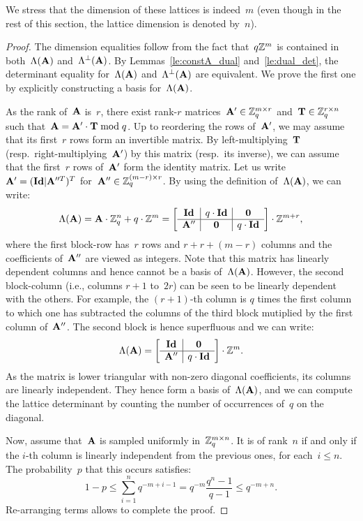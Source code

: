 We stress that the dimension of these lattices is indeed~$m$ (even though in the rest of this section, the lattice dimension is denoted
by~$n$).%


\begin{proof}
The dimension equalities follow from the fact that~$q \mathbb{Z}^m$ is contained in 
both~$\Lambda({\bf A})$ and~$\Lambda^{\perp}({\bf A})$. By Lemmas~\ref{le:constA_dual} and~\ref{le:dual_det},
the determinant equality for~$\Lambda({\bf A})$ and~$\Lambda^{\perp}({\bf A})$ are equivalent. We prove the first one
by explicitly constructing a basis for~$\Lambda({\bf A})$. 

As the rank of~${\bf A}$ is~$r$, there exist rank-$r$ matrices~${\bf A}' \in \mathbb{Z}_q^{m \times r}$ and~${\bf T} \in \mathbb{Z}_q^{r \times n}$ such  that~${\bf A} = {\bf A}' \cdot {\bf T} \bmod q$. Up to reordering the rows of~${\bf A}'$, we may assume that its first~$r$ rows form 
an invertible matrix. By left-multiplying~${\bf T}$ (resp.\ right-multiplying~${\bf A}'$) by this matrix (resp.\ its inverse), we can assume that the first~$r$ rows of~${\bf A}'$ form the identity matrix. Let us write~${\bf A}' = ({\bf Id} | {\bf A}''^T)^T$ for~${\bf A}'' \in \mathbb{Z}_q^{(m-r) \times r}$. By using the definition of~$\Lambda({\bf A})$, we can write:
\[
\Lambda({\bf A}) = {\bf A} \cdot \mathbb{Z}_q^n + q\cdot \mathbb{Z}^m = \left[ \begin{array}{c|c|c} 
{\bf Id} & q \cdot {\bf Id} & {\bf 0} \\ \hline
{\bf A}'' & {\bf 0} &  q \cdot {\bf Id}
\end{array}\right] \cdot \mathbb{Z}^{m+r},
\]
where the first block-row has~$r$ rows and $r+r+(m-r)$ columns and the coefficients of~${\bf A}''$ are viewed as integers. 
Note that this matrix has linearly dependent columns and hence
cannot be a basis of~$\Lambda({\bf A})$. However, the second block-column (i.e., columns $r+1$ to~$2r$) can be seen to be linearly 
dependent with the others. For example, the $(r+1)$-th column is $q$ times the first column to which one has subtracted the  columns of the third block  mutiplied by the first column of~${\bf A}''$. The second block is hence superfluous and we can write:
  \[
\Lambda({\bf A}) =  \left[ \begin{array}{c|c} 
{\bf Id} &  {\bf 0} \\ \hline
{\bf A}'' &   q \cdot {\bf Id}
\end{array}\right] \cdot \mathbb{Z}^{m}.
\]
As the matrix is lower triangular with non-zero diagonal coefficients, its columns are linearly independent. They hence form a basis of~$\Lambda({\bf A})$, and we can compute the lattice determinant by counting the number of occurrences of~$q$ on the diagonal. 

Now, assume that~${\bf A}$ is sampled uniformly in~$\mathbb{Z}_q^{m \times n}$. It is of rank~$n$ if and only if the $i$-th column is linearly independent from the previous ones, for each~$i \leq n$. The probability~$p$ that this occurs satisfies:
\[
1- p \leq \sum_{i=1}^n q^{-m+i-1}  = q^{-m} \frac{q^n-1}{q-1} \leq q^{-m+n}.
\]
Re-arranging terms allows to complete the proof.
\end{proof}

